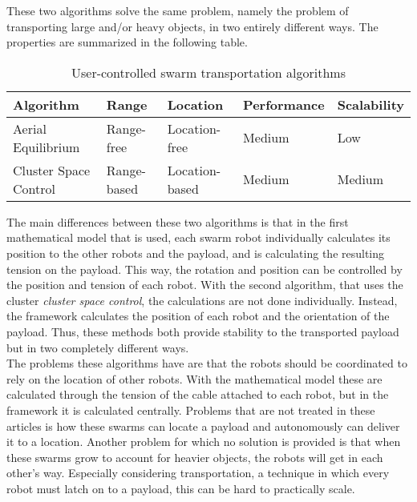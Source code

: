 These two algorithms solve the same problem, namely the problem of transporting large and/or heavy objects, in two entirely different ways. 
The properties are summarized in the following table. 


  \begin{table}[H]
  \renewcommand{\arraystretch}{1.3}
  \caption{User-controlled swarm transportation algorithms}
  \label{table_alg_coltrans1}
  \centering
  \begin{tabular}{|p{3cm}|l|l|l|l|}
    \hline
    \bfseries Algorithm & \bfseries Range &\bfseries Location &  \bfseries Performance & \bfseries Scalability\\
    \hline
     Aerial Equilibrium & Range-free & Location-free & Medium & Low\\\hline
     Cluster Space Control & Range-based & Location-based & Medium & Medium\\\hline

    \end{tabular}
  \end{table}

The main differences between these two algorithms is that in the first mathematical model that is used, each swarm robot individually calculates its position to the other robots and the payload, and is calculating the resulting tension on the payload. 
This way, the rotation and position can be controlled by the position and tension of each robot. 
With the second algorithm, that uses the cluster \emph{cluster space control}, the calculations are not done individually. 
Instead, the framework calculates the position of each robot and the orientation of the payload. 
Thus, these methods both provide stability to the transported payload but in two completely different ways. \\

The problems these algorithms have are that the robots should be coordinated to rely on the location of other robots.
With the mathematical model these are calculated through the tension of the cable attached to each robot, but in the framework it is calculated centrally. 
Problems that are not treated in these articles is how these swarms can locate a payload and autonomously can deliver it to a location. 
Another problem for which no solution is provided is that when these swarms grow to account for heavier objects, the robots will get in each other's way. 
Especially considering transportation, a technique in which every robot must latch on to a payload, this can be hard to practically scale. 

